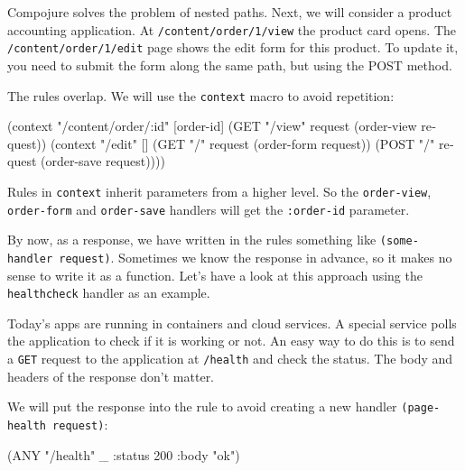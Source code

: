 \begin{english}
\end{english}

Compojure solves the problem of nested paths. Next, we will consider a product accounting application. At \verb|/content/order/1/view| the product card opens. The \verb|/content/order/1/edit| page shows the edit form for this product. To update it, you need to submit the form along the same path, but using the POST method.

The rules overlap. We will use the \verb|context| macro to avoid repetition:


\begin{english}
\begin{clojure}
(context "/content/order/:id" [order-id]
(GET  "/view" request (order-view request))
(context "/edit" []
(GET  "/" request (order-form request))
(POST "/" request (order-save request))))
\end{clojure}
\end{english}

Rules in \verb|context| inherit parameters from a higher level. So the \verb|order-view|, \verb|order-form| and \verb|order-save| handlers will get the \verb|:order-id| parameter.

By now, as a response, we have written in the rules something like \verb|(some-handler request)|. Sometimes we know the response in advance, so it makes no sense to write it as a function. Let's have a look at this approach using the \verb|healthcheck| handler as an example.

Today's apps are running in containers and cloud services.  A special service polls the application to check if it is working or not. An easy way to do this is to send a \verb|GET| request to the application at \verb|/health| and check the status. The body and headers of the response don't matter.

We will put the response into the rule to avoid creating a new handler \verb|(page-health request)|:


\begin{english}
\begin{clojure}
(ANY "/health" _ {:status 200 :body "ok"})
\end{clojure}
\end{english}

